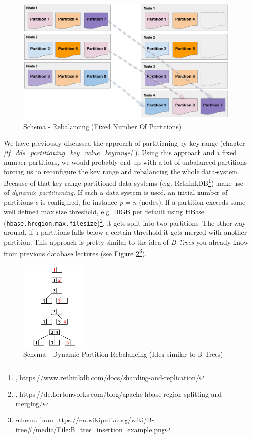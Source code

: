 {\begin{figure}[h]
	\centering
  \includegraphics[width=1\textwidth]{partitioning_rebalancing_fixed_no_partitions.png}
	\caption{Schema - Rebalancing (Fixed Number Of Partitions)}
	\label{partitioning_rebalancing_fixed_no_partitions}
\end{figure}

We have previously discussed the approach of partitioning by key-range (chapter \textit{\ref{tf_dds_partitioning_key_value_keyrange} }). Using this approach and a fixed number partitions, we would probably end up with a lot of unbalanced partitions forcing us to reconfigure the key range and rebalancing the whole data-system. Because of that key-range partitioned data-systems (e.g. RethinkDB\footnote{\cite{RDBSR}, https://www.rethinkdb.com/docs/sharding-and-replication/}) make use of \textit{dynamic partitioning}. If such a data-system is used, an initial number of partitions \textit{p} is configured, for instance \textit{p} = \textit{n} (nodes). If a partition exceeds some well defined max size threshold, e.g. 10GB per default using HBase (\lstinline{hbase.hregion.max.filesize})\footnote{\cite{HBSSM}, https://de.hortonworks.com/blog/apache-hbase-region-splitting-and-merging/}, it gets split into two partitions. The other way around, if a partitions falls below a certain threshold it gets merged with another partition. This approach is pretty similar to the idea of \textit{B-Trees} you already know from previous database lectures (see Figure \ref{partitioning_rebalancing_b_trees}\footnote{schema from https://en.wikipedia.org/wiki/B-tree\#/media/File:B\_tree\_insertion\_example.png}).
\begin{figure}[h]
	\centering
  \includegraphics[width=0.3\textwidth]{partitioning_rebalancing_b_trees.png}
	\caption{Schema - Dynamic Partition Rebalancing (Idea similar to B-Trees)}
	\label{partitioning_rebalancing_b_trees}
\end{figure}

}
